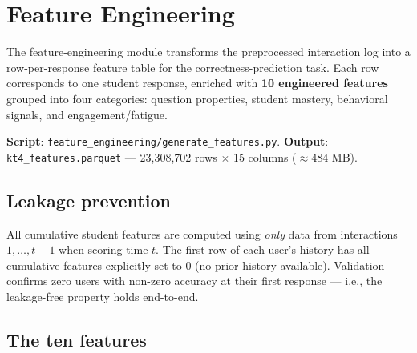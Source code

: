 \section{Feature Engineering}

The feature-engineering module transforms the preprocessed interaction
log into a row-per-response feature table for the correctness-prediction
task. Each row corresponds to one student response, enriched with
\textbf{10 engineered features} grouped into four categories: question
properties, student mastery, behavioral signals, and engagement/fatigue.

\textbf{Script}: \texttt{feature\_engineering/generate\_features.py}.
\textbf{Output}: \texttt{kt4\_features.parquet} —
23{,}308{,}702 rows $\times$ 15 columns ($\approx$484 MB).

\subsection{Leakage prevention}

All cumulative student features are computed using \emph{only} data
from interactions $1, \ldots, t-1$ when scoring time $t$. The first row
of each user's history has all cumulative features explicitly set to 0
(no prior history available). Validation confirms zero users with
non-zero accuracy at their first response — i.e., the leakage-free
property holds end-to-end.

\subsection{The ten features}

